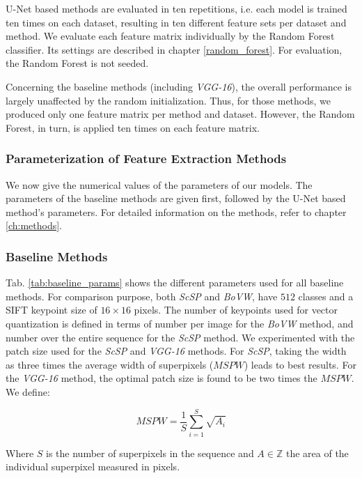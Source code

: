 U-Net based methods are evaluated in ten repetitions, i.e. each model is trained ten times on each dataset, resulting in ten different feature sets per dataset and method. We evaluate each feature matrix individually by the Random Forest classifier. Its settings are described in chapter \ref{random_forest}. For evaluation, the Random Forest is not seeded.

Concerning the baseline methods (including \textit{VGG-16}), the overall performance is largely unaffected by the random initialization. Thus, for those methods, we produced only one feature matrix per method and dataset. However, the Random Forest, in turn, is applied ten times on each feature matrix.

\subsubsection{Parameterization of Feature Extraction Methods}
We now give the numerical values of the parameters of our models. The parameters of the baseline methods are given first, followed by the U-Net based method's parameters. For detailed information on the methods, refer to chapter \ref{ch:methods}.

\subsubsection{Baseline Methods}
Tab. \ref{tab:baseline_params} shows the different parameters used for all baseline methods. For comparison purpose, both \textit{ScSP} and \textit{BoVW}, have $512$ classes and a SIFT keypoint size of $16 \times 16$ pixels. The number of keypoints used for vector quantization is defined in terms of number per image for the \textit{BoVW} method, and number over the entire sequence for the \textit{ScSP} method. We experimented with the patch size used for the \textit{ScSP} and \textit{VGG-16} methods. For \textit{ScSP}, taking the width as three times the average width of superpixels ($MSPW$) leads to best results. For the \textit{VGG-16} method, the optimal patch size is found to be two times the $MSPW$. We define:

\begin{equation}
   MSPW = \frac{1}{S} \sum_{i=1}^S \sqrt{A_i}
   \label{eq:mspw} 
\end{equation}
\vspace{6pt}

Where $S$ is the number of superpixels in the sequence and $A \in \mathbb{Z}$ the area of the individual superpixel measured in pixels. 

